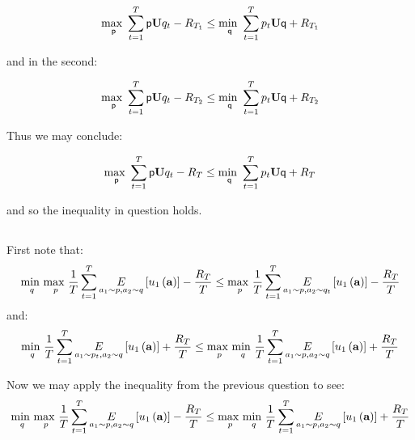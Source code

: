 \documentclass[]{article}
\begin{document}
\begin{equation}
	\underset{\mathsf{p}}{\text{max }} \sum_{t=1}^{T} \mathsf{p} \textbf{U} q_t - R_{T_1} \le \underset{\mathsf{q}}{\text{min }} \sum_{t=1}^{T} p_t \textbf{U} \mathsf{q} + R_{T_1}
\notag
\end{equation}

\noindent
and in the second:

\noindent
\begin{equation}
	\underset{\mathsf{p}}{\text{max }} \sum_{t=1}^{T} \mathsf{p} \textbf{U} q_t - R_{T_2} \le \underset{\mathsf{q}}{\text{min }} \sum_{t=1}^{T} p_t \textbf{U} \mathsf{q} + R_{T_2}
\notag
\end{equation}

\noindent
Thus we may conclude:

\begin{equation}
	\underset{\mathsf{p}}{\text{max }} \sum_{t=1}^{T} \mathsf{p} \textbf{U} q_t - R_{T} \le \underset{\mathsf{q}}{\text{min }} \sum_{t=1}^{T} p_t \textbf{U} \mathsf{q} + R_{T}
\notag
\end{equation}

\noindent and so the inequality in question holds.

\subsection{}
\noindent
First note that:
\begin{equation}
	\underset{q}{\text{min }}\underset{p}{\text{max }}\frac{1}{T}\sum_{t=1}^{T}\underset{a_1 \sim p, a_2 \sim q}{E}\left[u_1\left(\textbf{a}\right)\right] - \frac{R_T}{T}
	\le
	\underset{p}{\text{max }}\frac{1}{T}\sum_{t=1}^{T}\underset{a_1 \sim p, a_2 \sim q_t}{E}\left[u_1\left(\textbf{a}\right)\right] - \frac{R_T}{T}
\notag
\end{equation}
\noindent and:
\begin{equation}
	\underset{q}{\text{min }}\frac{1}{T}\sum_{t=1}^{T}\underset{a_1 \sim p_t, a_2 \sim q}{E}\left[u_1\left(\textbf{a}\right)\right] + \frac{R_T}{T}
	\le
	\underset{p}{\text{max }}\underset{q}{\text{min }}\frac{1}{T}\sum_{t=1}^{T}\underset{a_1 \sim p, a_2 \sim q}{E}\left[u_1\left(\textbf{a}\right)\right] + \frac{R_T}{T}
\notag
\end{equation}

\noindent Now we may apply the inequality from the previous question to see:
\begin{equation}
	\underset{q}{\text{min }}\underset{p}{\text{max }}\frac{1}{T}\sum_{t=1}^{T}\underset{a_1 \sim p, a_2 \sim q}{E}\left[u_1\left(\textbf{a}\right)\right] - \frac{R_T}{T}
	\le
	\underset{p}{\text{max }}\underset{q}{\text{min }}\frac{1}{T}\sum_{t=1}^{T}\underset{a_1 \sim p, a_2 \sim q}{E}\left[u_1\left(\textbf{a}\right)\right] + \frac{R_T}{T}
\notag
\end{equation}
\end{document}
